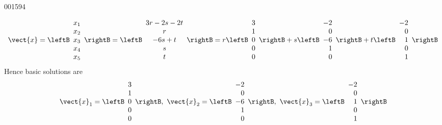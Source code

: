 \begin{example}{}{001594}
\begin{solution}
\begin{equation*}
\vect{x} = 
\leftB \begin{array}{r}
	x_1 \\
	x_2 \\
	x_3 \\
	x_4 \\
	x_5
\end{array} \rightB
=
\leftB \begin{array}{c}
	3r - 2s - 2t \\
	r \\
	-6s + t \\
	s \\
	t
\end{array} \rightB
= r
\leftB \begin{array}{r}
	3 \\
	1 \\
	0 \\
	0 \\
	0
\end{array} \rightB
+ s
\leftB \begin{array}{r}
	-2 \\
	0 \\
	-6 \\
	1 \\
	0
\end{array} \rightB
+ t
\leftB \begin{array}{r}
	-2 \\
	0 \\
	1 \\
	0 \\
	1
\end{array} \rightB
\end{equation*}
Hence basic solutions are 
\begin{equation*}
\vect{x}_1 =
\leftB \begin{array}{r}
	3 \\
	1 \\
	0 \\
	0 \\
	0
\end{array} \rightB, \
 \vect{x}_2 =
\leftB \begin{array}{r}
	-2 \\
	0 \\
	-6 \\
	1 \\
	0
\end{array} \rightB,\
\vect{x}_3 =
\leftB \begin{array}{r}
	-2 \\
	0 \\
	1 \\
	0 \\
	1
\end{array} \rightB
\end{equation*}
\end{solution}
\end{example}
